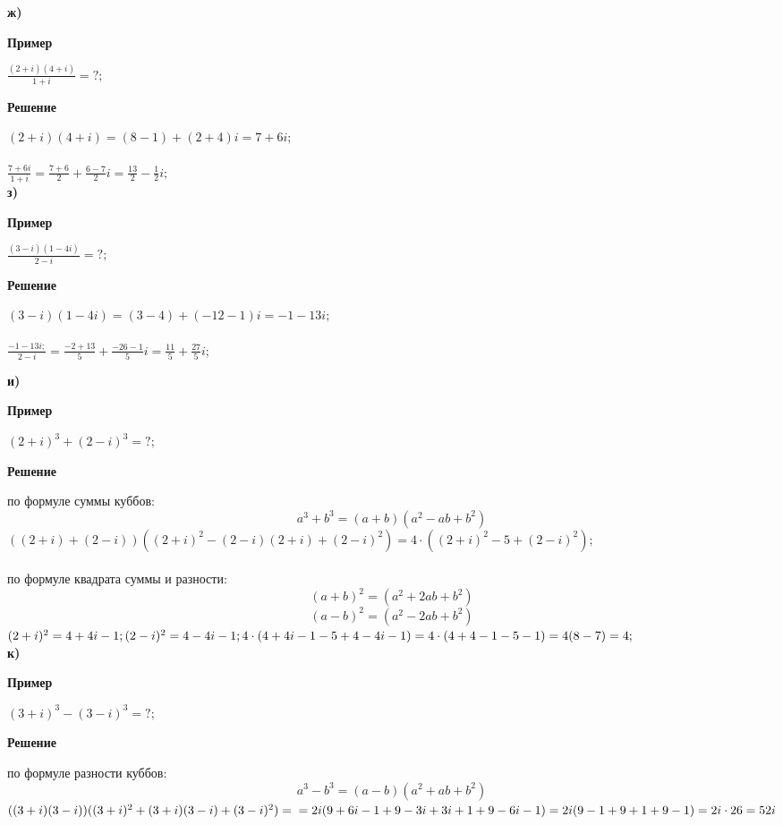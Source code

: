 \documentclass[12pt]{article}
\begin{document}
\newpage
\textbf{ж)}\\
\begin{center}\textbf{Пример}\end{center}
$
\displaystyle
\frac{(2+i)(4+i)}{1+i}=?;
$\\
\begin{center}\textbf{Решение}\end{center}
$
(2+i)(4+i)=(8-1)+(2+4)i=7+6i;
$\\
\\
$
\displaystyle
\frac{7+6i}{1+i}=
\frac{7+6}{2}+
\frac{6-7}{2}i=
\frac{13}{2}-
\frac{1}{2}i;
$\\

\newpage
\textbf{з)}\\
\begin{center}\textbf{Пример}\end{center}
$
\displaystyle
\frac{(3-i)(1-4i)}{2-i}=?;
$\\
\begin{center}\textbf{Решение}\end{center}
$
(3-i)(1-4i)=(3-4)+(-12-1)i=-1-13i;
$\\
\\
$
\displaystyle
\frac{-1-13i;}{2-i}=
\frac{-2+13}{5}+
\frac{-26-1}{5}i=
\frac{11}{5}+
\frac{27}{5}i;
$

\newpage
\textbf{и)}\\
\begin{center}\textbf{Пример}\end{center}
$
(2+i)^3+(2-i)^3=?;
$\\
\begin{center}\textbf{Решение}\end{center}
по формуле суммы куббов:
$$
a^3+b^3=(a+b)(a^2-ab+b^2)
$$
$
((2+i)+(2-i))
(
(2+i)^2-(2-i)(2+i)+(2-i)^2
)=
4\cdot((2+i)^2-5+(2-i)^2);
$\\
\\
по формуле квадрата суммы и разности:
$$(a+b)^2=(a^2+2ab+b^2)$$
$$(a-b)^2=(a^2-2ab+b^2)$$
$
(2+i)^2 = 4+4i-1;\\
(2-i)^2 = 4-4i-1;\\
4\cdot(4+4i-1-5+4-4i-1)=4\cdot(4+4-1-5-1)=4(8-7)=4;
$\\

\newpage
\textbf{к)}\\
\begin{center}\textbf{Пример}\end{center}
$
(3+i)^3-(3-i)^3=?;
$\\
\begin{center}\textbf{Решение}\end{center}
по формуле разности куббов:
$$
a^3-b^3=(a-b)(a^2+ab+b^2)
$$
$
((3+i)(3-i))
((3+i)^2+(3+i)(3-i)+(3-i)^2)=\\
=2i(9+6i-1+9-3i+3i+1+9-6i-1)=
2i(9-1+9+1+9-1)=
2i\cdot26=
52i
$
\end{document}
